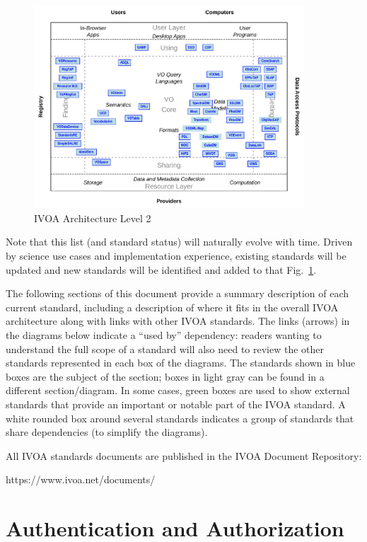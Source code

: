 \documentclass[11pt,a4paper]{ivoa}
\begin{document}
\begin{figure}[h]
\centering
\includegraphics[width=0.9\textwidth]{archdiag2.pdf}
\caption{IVOA Architecture Level 2}
\label{fig:architecture2}
\end{figure}

Note that this list  (and standard status) will naturally evolve with time. Driven by
science use cases and implementation experience, existing standards will be updated and
new standards will be identified and added to that Fig.~\ref{fig:architecture2}. 

The following sections of this document provide a summary description of each current standard, 
including a description of where it fits in the overall IVOA architecture along with links with 
other IVOA standards. The links 
(arrows) in the diagrams below indicate a ``used by'' dependency: readers wanting to 
understand the full scope of a standard will also need to review the other standards 
represented in each box of the diagrams. 
The standards shown in blue boxes are the subject of the section; 
boxes in light gray can be found in a different section/diagram. 
In some cases, green boxes are used to show external standards that provide an 
important or notable part of the IVOA standard. 
A white rounded box around several standards indicates a group of standards that share 
dependencies (to simplify the diagrams).

All IVOA standards documents are published in the IVOA Document Repository:

https://www.ivoa.net/documents/


\section{Authentication and Authorization}
\end{document}
